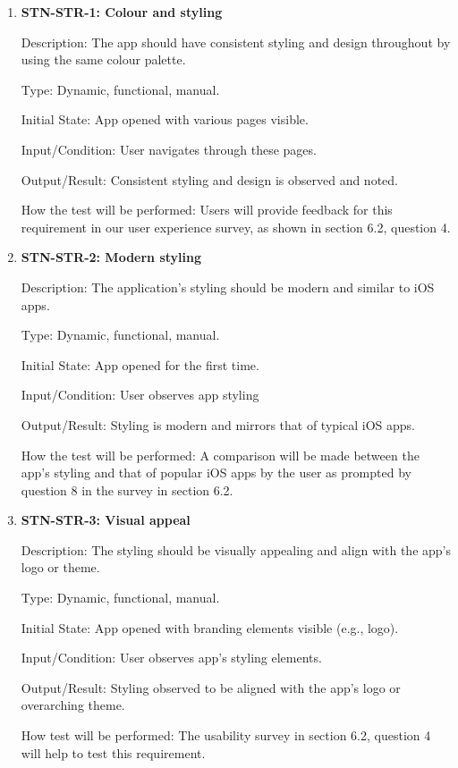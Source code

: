 \documentclass[12pt, titlepage]{article}
\begin{document}
\begin{enumerate}

\item {\textbf{STN-STR-1: Colour and styling}}

Description: The app should have consistent styling and design throughout by using the same colour palette. 

Type: Dynamic, functional, manual.

Initial State: App opened with various pages visible.

Input/Condition: User navigates through these pages. 

Output/Result: Consistent styling and design is observed and noted.

How the test will be performed: Users will provide feedback for this requirement in our user experience survey, as shown in section 6.2, question 4. 

\item{\textbf{STN-STR-2: Modern styling}}

Description: The application’s styling should be modern and similar to iOS apps.

Type: Dynamic, functional, manual.

Initial State: App opened for the first time.

Input/Condition: User observes app styling

Output/Result: Styling is modern and mirrors that of typical iOS apps. 

How the test will be performed: A comparison will be made between the app's styling and that of popular iOS apps by the user as prompted by question 8 in the survey in section 6.2. 


\item{\textbf{STN-STR-3: Visual appeal}}

Description: The styling should be visually appealing and align with the app’s logo or theme.

Type: Dynamic, functional, manual.

Initial State: App opened with branding elements visible (e.g., logo).

Input/Condition: User observes app's styling elements.

Output/Result: Styling observed to be aligned with the app's logo or overarching theme.

How test will be performed: The usability survey in section 6.2, question 4 will help to test this requirement.

\end{enumerate}
\end{document}
